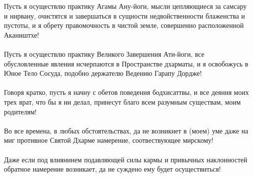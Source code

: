 Пусть я осуществлю практику Агамы Ану-йоги, мысли
цепляю\-щиеся за самсару и нирвану, очистятся и завершаться
в сущности недвойственности блаженства и пустоты,
и я обрету правомочность в чистой земле, совершенно расположенной Акаништхе!\\
\\
Пусть я осуществлю практику Великого Завершения Ати-йоги,
все обусловленные явления исчерпаются в Пространстве дхарматы,
и я освобожусь в Юное Тело Сосуда, подобно держателю Ведению Гарапу Дордже!\\
\\
Говоря кратко, пусть я начну с обетов поведения бодхисаттвы,
и все деяния моих трех врат, что бы я ни делал,
принесут благо всем разумным существам, моим родителям!\\
\\
Во все времена, в любых обстоятельствах, да не возникнет
в (моем) уме даже на миг противное Святой Дхарме намерение, соотвествующее мирскому!\\
\\
Даже если под влиянинем подавляющей силы кармы и привыч\-ных наклонностей 
обратное намерение возникает, да не сужде\-но ему будет осуществиться!\\

